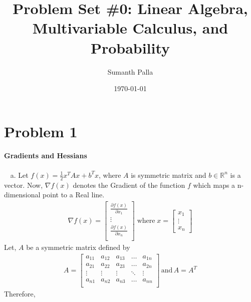 \documentclass{article}
\title{Problem Set \#0: Linear Algebra, Multivariable Calculus, and Probability}
\author{Sumanth Palla}
\date{\today}
\begin{document}
\maketitle
\section{Problem 1}
\textbf{Gradients and Hessians\\\\\ }
a. Let $f(x) = \frac{1}{2} x^TAx + b^Tx$, where $A$ is symmetric matrix and $b \in \mathbb{R}^n$ is a vector. Now, $\nabla f(x)$ denotes the Gradient of the function $f$ which maps
a n-dimensional point to a Real line. \\
\begin{align*}
    \nabla f(x) = \begin{bmatrix}
        \frac{\partial f(x)}{\partial x_1} \\
        \vdots \\
        \frac{\partial f(x)}{\partial x_n} \\
    \end{bmatrix} \;
    \text{where} \; x = \begin{bmatrix}
        x_1 \\
        \vdots \\
        x_n
    \end{bmatrix}
\end{align*} 
Let, $A$ be a symmetric matrix defined by 
\begin{gather*}
   A =  \begin{bmatrix}
        a_{11} & a_{12} & a_{13} & \hdots & a_{1n} \\
        a_{21}  & a_{22} & a_{23} & \hdots & a_{2n} \\
        \vdots & \vdots & \vdots & \ddots & \vdots \\
        a_{n1} & a_{n2} & a_{n3} & \hdots &  a_{nn} \\
    \end{bmatrix} \,
    \text{and} \,
    A = A^T
\end{gather*} 
Therefore, 
\end{document}
